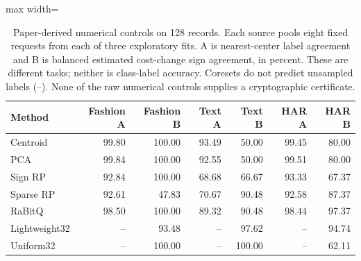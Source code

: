 \begin{table}[tbp]
\centering
\small
\caption{Paper-derived numerical controls on 128 records. Each source pools eight fixed requests from each of three exploratory fits. A is nearest-center label agreement and B is balanced estimated cost-change sign agreement, in percent. These are different tasks; neither is class-label accuracy. Coresets do not predict unsampled labels (--). None of the raw numerical controls supplies a cryptographic certificate.}
\label{tab:latest-native}
\begin{adjustbox}{max width=\textwidth}
\begin{tabular*}{.98\textwidth}{@{\extracolsep{\fill}}lrrrrrr@{}}
\toprule
Method & Fashion A & Fashion B & Text A & Text B & HAR A & HAR B\\
\midrule
Centroid & 99.80 & 100.00 & 93.49 & 50.00 & 99.45 & 80.00\\
PCA & 99.84 & 100.00 & 92.55 & 50.00 & 99.51 & 80.00\\
Sign RP & 92.84 & 100.00 & 68.68 & 66.67 & 93.33 & 67.37\\
Sparse RP & 92.61 & 47.83 & 70.67 & 90.48 & 92.58 & 87.37\\
RaBitQ & 98.50 & 100.00 & 89.32 & 90.48 & 98.44 & 97.37\\
Lightweight32 & -- & 93.48 & -- & 97.62 & -- & 94.74\\
Uniform32 & -- & 100.00 & -- & 100.00 & -- & 62.11\\
\bottomrule
\end{tabular*}
\end{adjustbox}
\end{table}
